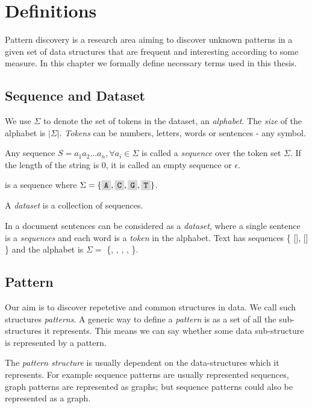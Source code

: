 \chapter{Definitions}

Pattern discovery is a research area aiming to discover unknown patterns in a given set of data structures that are frequent and interesting according to some measure. In this chapter we formally define necessary terms used in this thesis.

\section{Sequence and Dataset}

We use $\Sigma$ to denote the set of tokens in the dataset, an \emph{alphabet}. 
The \emph{size} of the alphabet is $|\Sigma|$. \emph{Tokens} can be numbers, 
letters, words or sentences - any symbol.

Any sequence $S=a_1 a_2 ... a_n, \forall a_i \in \Sigma$ is called a \emph{sequence} 
over the token set $\Sigma$. If the length of the
string is $0$, it is called an empty sequence or $\epsilon$.

\begin{exmp}
 is a sequence where $\Sigma = \{\R{A}, \R{C}, \R{G}, \R{T}\}$.
\end{exmp}

A \emph{dataset} is a collection of sequences.

\begin{exmp}
In a document sentences can be considered as a \emph{dataset}, where a single sentence is a \emph{sequences} and each word is a \emph{token} in the alphabet. Text  has sequences \{ [], [] \} and the alphabet is $\Sigma =$ \{, , , , \}.	
\end{exmp}

\section{Pattern}

Our aim is to discover repetetive and common structures in data. We call such structures \emph{patterns}. A generic way to define a \emph{pattern} is as a set of all the sub-structures it represents. This means we can say whether some data sub-structure is represented by a pattern.

The \emph{pattern structure} is usually dependent on the data-structures which it represents. For example sequence patterns are usually represented sequences, graph patterns are represented as graphs; but sequence patterns could also be represented as a graph.

